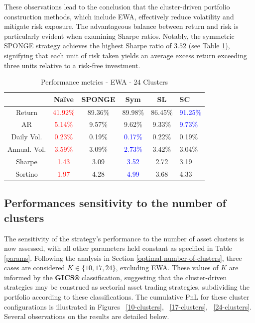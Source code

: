 \documentclass[sigconf]{acmart}
\begin{document}
These observations lead to the conclusion that the cluster-driven portfolio construction methods, which include EWA, effectively reduce volatility and mitigate risk exposure. The advantageous balance between return and risk is particularly evident when examining Sharpe ratios. Notably, the symmetric SPONGE strategy achieves the highest Sharpe ratio of $3.52$ (see Table \ref{EWA_24_perf_metrics}), signifying that each unit of risk taken yields an average excess return exceeding three units relative to a risk-free investment.
\vspace{3pt}
\begin{table}[H]
  \caption{Performance metrics - EWA - 24 Clusters}
  \label{EWA_24_perf_metrics}
  \begin{tabular}{cccccl}
    \toprule
     &  Naïve & \textbf{SPONGE} &  Sym & SL & SC\\
    \midrule
    Return & \textcolor{red}{41.92\%} & 89.36\% & 89.98\% & 86.45\% &\textcolor{blue}{91.25\%}\\ 
    AR & \textcolor{red}{5.14\%} & 9.57\% & 9.62\% & 9.33\% & \textcolor{blue}{9.73\%} \\ 
    Daily Vol. &  \textcolor{red}{0.23\%} & 0.19\% &  \textcolor{blue}{0.17\%} & 0.22\% & 0.19\% \\ 
    Annual. Vol. &  \textcolor{red}{3.59\%} & 3.09\% &  \textcolor{blue}{2.73\%} & 3.42\% &3.04\%\\ 
    Sharpe & \textcolor{red}{1.43} & 3.09 & \textcolor{blue}{3.52} & 2.72 &3.19\\ 
    Sortino & \textcolor{red}{1.97} & 4.28 & \textcolor{blue}{4.99} & 3.68& 4.33\\ 
  \bottomrule
\end{tabular}
\end{table}

\subsection{Performances sensitivity to the number of clusters}

The sensitivity of the strategy’s performance to the number of asset clusters is now assessed, with all other parameters held constant as specified in Table \ref{params}. Following the analysis in Section \ref{optimal-number-of-clusters}, three cases are considered $K \in \{10, 17, 24\}$, excluding EWA. These values of $K$ are informed by the \textbf{GICS®} classification, suggesting that the cluster-driven strategies may be construed as sectorial asset trading strategies, subdividing the portfolio according to these classifications. The cumulative PnL for these cluster configurations is illustrated in Figures ~\ref{10-clusters}, ~\ref{17-clusters}, ~\ref{24-clusters}. Several observations on the results are detailed below.
\end{document}
